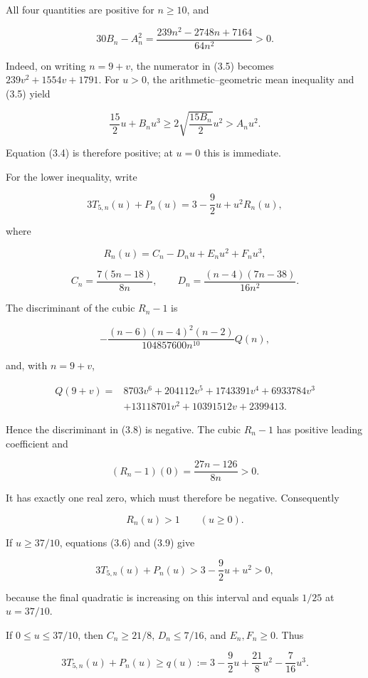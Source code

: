 \documentclass[11pt]{article}
\begin{document}
All four quantities are positive for $n\ge10$, and

\[
30B_n-A_n^2
=\frac{239n^2-2748n+7164}{64n^2}>0.                              \tag{3.5}
\]

Indeed, on writing $n=9+v$, the numerator in (3.5) becomes
$239v^2+1554v+1791$. For $u>0$, the arithmetic--geometric mean
inequality and (3.5) yield

\[
\frac{15}{2}u+B_nu^3
\ge 2\sqrt{\frac{15B_n}{2}}u^2>A_nu^2.
\]

Equation (3.4) is therefore positive; at $u=0$ this is immediate.

For the lower inequality, write

\[
3T_{5,n}(u)+P_n(u)=3-\frac92u+u^2R_n(u),                             \tag{3.6}
\]

where

\[
R_n(u)=C_n-D_nu+E_nu^2+F_nu^3,
\]

\[
C_n=\frac{7(5n-18)}{8n},\qquad
D_n=\frac{(n-4)(7n-38)}{16n^2}.                                    \tag{3.7}
\]

The discriminant of the cubic $R_n-1$ is

\[
-\frac{(n-6)(n-4)^2(n-2)}{104857600n^{10}}Q(n),                    \tag{3.8}
\]

and, with $n=9+v$,

\[
\begin{aligned}
Q(9+v)={}&8703v^6+204112v^5+1743391v^4+6933784v^3\\
&+13118701v^2+10391512v+2399413.
\end{aligned}
\]

Hence the discriminant in (3.8) is negative. The cubic $R_n-1$ has
positive leading coefficient and

\[
(R_n-1)(0)=\frac{27n-126}{8n}>0.
\]

It has exactly one real zero, which must therefore be negative. Consequently

\[
R_n(u)>1\qquad (u\ge0).                                             \tag{3.9}
\]

If $u\ge37/10$, equations (3.6) and (3.9) give

\[
3T_{5,n}(u)+P_n(u)>3-\frac92u+u^2>0,
\]

because the final quadratic is increasing on this interval and equals
$1/25$ at $u=37/10$.

If $0\le u\le37/10$, then $C_n\ge21/8$, $D_n\le7/16$, and
$E_n,F_n\ge0$. Thus

\[
3T_{5,n}(u)+P_n(u)
\ge q(u):=3-\frac92u+\frac{21}{8}u^2-\frac7{16}u^3.                 \tag{3.10}
\]
\end{document}
